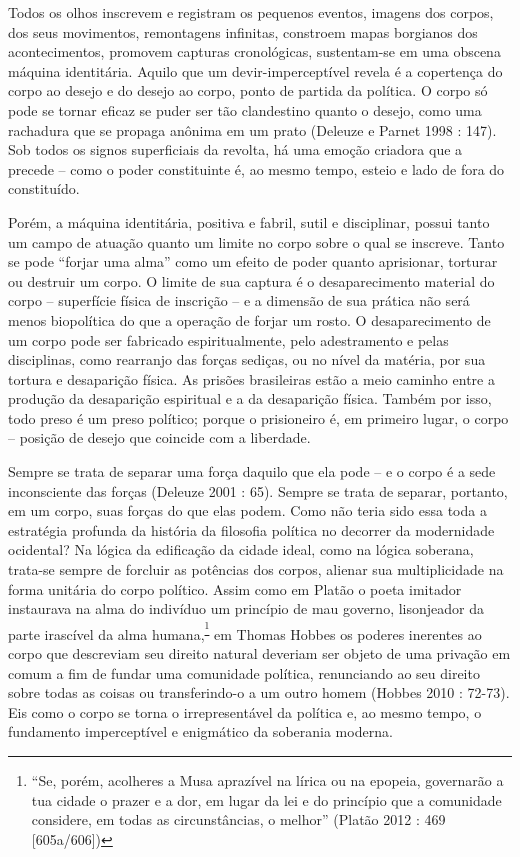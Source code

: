 Todos os olhos inscrevem e
registram os pequenos eventos, imagens dos corpos, dos seus movimentos,
remontagens infinitas, constroem mapas borgianos dos acontecimentos,
promovem capturas cronológicas, sustentam-se em uma obscena máquina
identitária. Aquilo que um devir-imperceptível revela é a copertença do
corpo ao desejo e do desejo ao corpo, ponto de partida da política. O
corpo só pode se tornar eficaz se puder ser tão clandestino quanto o
desejo, como uma rachadura que se propaga anônima em um prato (Deleuze e
Parnet 1998 : 147). Sob todos os signos superficiais da revolta, há uma
emoção criadora que a precede -- como o poder constituinte é, ao mesmo
tempo, esteio e lado de fora do constituído.

Porém, a máquina identitária, positiva e fabril, sutil e disciplinar,
possui tanto um campo de atuação quanto um limite no corpo sobre o qual
se inscreve. Tanto se pode ``forjar uma alma'' como um efeito de poder
quanto aprisionar, torturar ou destruir um corpo. O limite de sua
captura é o desaparecimento material do corpo -- superfície física de
inscrição -- e a dimensão de sua prática não será menos biopolítica do
que a operação de forjar um rosto. O desaparecimento de um corpo pode
ser fabricado espiritualmente, pelo adestramento e pelas disciplinas,
como rearranjo das forças sediças, ou no nível da matéria, por sua
tortura e desaparição física. As prisões brasileiras estão a meio
caminho entre a produção da desaparição espiritual e a da desaparição
física. Também por isso, todo preso é um preso político; porque o
prisioneiro é, em primeiro lugar, o corpo -- posição de desejo que
coincide com a liberdade.

Sempre se trata de separar uma força daquilo que ela pode -- e o corpo é
a sede inconsciente das forças (Deleuze 2001 : 65). Sempre se trata de
separar, portanto, em um corpo, suas forças do que elas podem. Como não
teria sido essa toda a estratégia profunda da história da filosofia
política no decorrer da modernidade ocidental? Na lógica da edificação
da cidade ideal, como na lógica soberana, trata-se sempre de forcluir as
potências dos corpos, alienar sua multiplicidade na forma unitária do
corpo político. Assim como em Platão o poeta imitador instaurava na alma
do indivíduo um princípio de mau governo, lisonjeador da parte irascível
da alma humana,\textsuperscript{\footnote{``Se, porém, acolheres a Musa
  aprazível na lírica ou na epopeia, governarão a tua cidade o prazer e
  a dor, em lugar da lei e do princípio que a comunidade considere, em
  todas as circunstâncias, o melhor'' (Platão 2012 : 469 {[}605a/606{]})}}
em Thomas Hobbes os poderes inerentes ao corpo que descreviam seu
direito natural deveriam ser objeto de uma privação em comum a fim de
fundar uma comunidade política, renunciando ao seu direito sobre todas
as coisas ou transferindo-o a um outro homem (Hobbes 2010 : 72-73). Eis
como o corpo se torna o irrepresentável da política e, ao mesmo tempo, o
fundamento imperceptível e enigmático da soberania moderna.

